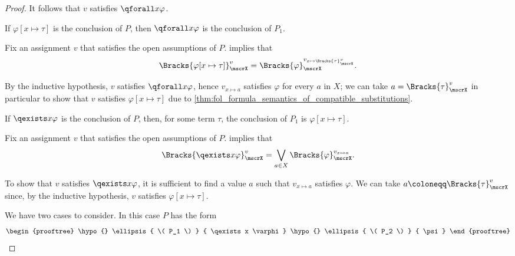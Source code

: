 \begin{proof}
  It follows that \( v \) satisfies \( \qforall x \varphi \).

   If \( \varphi[x \mapsto \tau] \) is the conclusion of \( P \), then \( \qforall x \varphi \) is the conclusion of \( P_1 \).

  Fix an assignment \( v \) that satisfies the open assumptions of \( P \).  implies that
  \begin{equation*}
    \Bracks{\varphi[x \mapsto \tau]}_\mscrX^v
    =
    \Bracks{\varphi}_\mscrX^{v_{x \mapsto \Bracks{\tau}_\mscrX^v}}.
  \end{equation*}

  By the inductive hypothesis, \( v \) satisfies \( \qforall x \varphi \), hence \( v_{x \mapsto a} \) satisfies \( \varphi \) for every \( a \) in \( X \); we can take \( a = \Bracks{\tau}_\mscrX^v \) in particular to show that \( v \) satisfies \( \varphi[x \mapsto \tau] \) due to \cref{thm:fol_formula_semantics_of_compatible_substitutions}.

   If \( \qexists x \varphi \) is the conclusion of \( P \), then, for some term \( \tau \), the conclusion of \( P_1 \) is \( \varphi[x \mapsto \tau] \).

  Fix an assignment \( v \) that satisfies the open assumptions of \( P \).  implies that
  \begin{equation*}
    \Bracks{\qexists x \varphi}_\mscrX^v
    =
    \bigvee_{a \in X} \Bracks{\varphi}_\mscrX^{v_{x \mapsto a}}.
  \end{equation*}

  To show that \( v \) satisfies \( \qexists x \varphi \), it is sufficient to find a value \( a \) such that \( v_{x \mapsto a} \) satisfies \( \varphi \). We can take \( a \coloneqq \Bracks{\tau}_\mscrX^v \) since, by the inductive hypothesis, \( v \) satisfies \( \varphi[x \mapsto \tau] \).

   We have two cases to consider.
   In this case \( P \) has the form
  \begin{equation*}
    \begin{prooftree}
      \hypo{}
      \ellipsis { \( P_1 \) } { \qexists x \varphi }

      \hypo{}
      \ellipsis { \( P_2 \) } { \psi }


\end{prooftree}
\end{equation*}
\end{proof}
